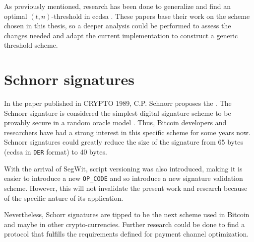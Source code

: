 As previously mentioned, research has been done to generalize and find an
optimal $(t, n)$-threshold in \gls{ecdsa} \cite{10.1007/BFb0052253,
10.1007/978-3-642-27954-6_20}. These papers base their work on the scheme chosen
in this thesis, so a deeper analysis could be performed to assess the
changes needed and adapt the current implementation to construct a generic threshold scheme.

\section{Schnorr signatures}

In the paper 
published in CRYPTO 1989, C.P. Schnorr proposes the  \cite{10.1007/0-387-34805-0_22}. The Schnorr signature is considered
the simplest digital signature scheme to be provably secure in a random oracle
model \cite{Bellare:1993:ROP:168588.168596, 10.1007/978-3-642-29011-4_33}. Thus,
Bitcoin developers and researchers have had a strong interest in this specific
scheme for some years now. Schnorr signatures could greatly reduce the size of
the signature from 65 bytes (\gls{ecdsa} in \texttt{DER} format) to 40 bytes.

With the arrival of SegWit, script versioning was also introduced, making it
is easier to introduce a new \texttt{OP\_CODE} and so introduce a new signature
validation scheme. However, this will not invalidate the present work and
research because of the specific nature of its application.

Nevertheless, Schorr signatures are tipped to be the next scheme used in Bitcoin
and maybe in other crypto-currencies. Further research could be done to find a
protocol that fulfills the requirements defined for payment channel
optimization.
